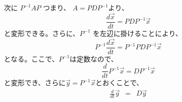 \documentclass[a4j]{jsarticle}
\begin{document}
\begin{spacing}{1.6}
\begin{qparts}
  次に $ P^{-1}AP $ つまり、 $ A = PDP^{-1} $より、
  \begin{equation*}
    \frac{d \overrightarrow{x}}{dt} = PDP^{-1} \overrightarrow x
  \end{equation*}
  と変形できる。さらに、$ P^{-1} $ を左辺に掛けることにより、
  \begin{equation*}
    P^{-1}\frac{d \overrightarrow{x}}{dt} = P^{-1}PDP^{-1}\overrightarrow x
  \end{equation*}
  となる。ここで、$P^{-1}$は定数なので、
  \begin{equation*}
    \frac{d}{dt}P^{-1}\overrightarrow x = DP^{-1}\overrightarrow x
  \end{equation*}
  と変形でき、さらに$\overrightarrow y = P^{-1}\overrightarrow x$とおくことで、
  \begin{eqnarray*}
    \frac{d}{dt}\overrightarrow y & = & D \overrightarrow y \\
  \end{eqnarray*}
  \newpage


\end{qparts}
\end{spacing}
\end{document}
